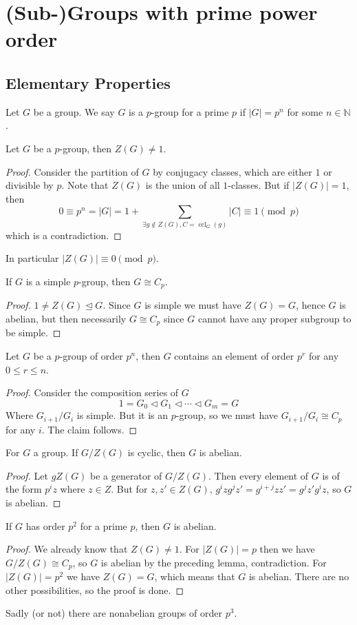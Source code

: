 \section{(Sub-)Groups with prime power order}
\subsection{Elementary Properties}
\begin{definition}
    Let $G$ be a group.
    We say $G$ is a $p$-group for a prime $p$ if $|G|=p^n$ for some $n\in\mathbb N$.
\end{definition}
\begin{theorem}
    Let $G$ be a $p$-group, then $Z(G)\neq 1$.
\end{theorem}
\begin{proof}
    Consider the partition of $G$ by conjugacy classes, which are either $1$ or divisible by $p$.
    Note that $Z(G)$ is the union of all $1$-classes.
    But if $|Z(G)|=1$, then
    $$0\equiv p^n=|G|=1+\sum_{\exists g\notin Z(G),C=\operatorname{ccl}_G(g)}|C|\equiv 1\pmod{p}$$
    which is a contradiction.
\end{proof}
In particular $|Z(G)|\equiv 0\pmod{p}$.
\begin{corollary}
    If $G$ is a simple $p$-group, then $G\cong C_p$.
\end{corollary}
\begin{proof}
    $1\neq Z(G)\unlhd G$.
    Since $G$ is simple we must have $Z(G)=G$, hence $G$ is abelian, but then necessarily $G\cong C_p$ since $G$ cannot have any proper subgroup to be simple.
\end{proof}
\begin{corollary}
    Let $G$ be a $p$-group of order $p^n$, then $G$ contains an element of order $p^r$ for any $0\le r\le n$.
\end{corollary}
\begin{proof}
    Consider the composition series of $G$
    $$1=G_0\lhd G_1\lhd\cdots\lhd G_m=G$$
    Where $G_{i+1}/G_i$ is simple.
    But it is an $p$-group, so we must have $G_{i+1}/G_i\cong C_p$ for any $i$.
    The claim follows.
\end{proof}
\begin{lemma}
    For $G$ a group.
    If $G/Z(G)$ is cyclic, then $G$ is abelian.
\end{lemma}
\begin{proof}
    Let $gZ(G)$ be a generator of $G/Z(G)$.
    Then every element of $G$ is of the form $p^iz$ where $z\in Z$.
    But for $z,z'\in Z(G)$, $g^izg^jz'=g^{i+j}zz'=g^jz'g^iz$, so $G$ is abelian.
\end{proof}
\begin{corollary}
    If $G$ has order $p^2$ for a prime $p$, then $G$ is abelian.
\end{corollary}
\begin{proof}
    We already know that $Z(G)\neq 1$.
    For $|Z(G)|=p$ then we have $G/Z(G)\cong C_p$, so $G$ is abelian by the preceding lemma, contradiction.
    For $|Z(G)|=p^2$ we have $Z(G)=G$, which means that $G$ is abelian.
    There are no other possibilities, so the proof is done.
\end{proof}
Sadly (or not) there are nonabelian groups of order $p^3$.
